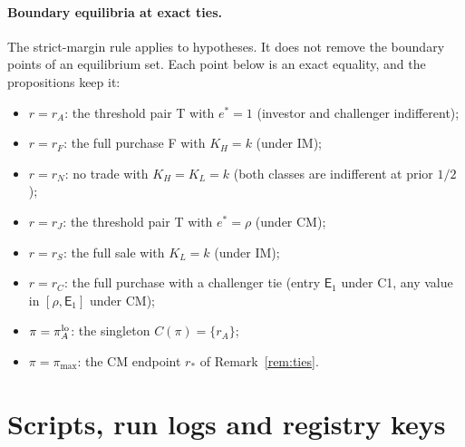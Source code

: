 \documentclass[11pt]{article}
\theoremstyle{definition}
\newcommand{\Ent}{\mathsf E}
\begin{document}
\paragraph{Boundary equilibria at exact ties.} The strict-margin rule applies to hypotheses. It does not remove the
boundary points of an equilibrium set. Each point below is an exact equality, and the propositions keep it:
\begin{itemize}
\item $r=r_A$: the threshold pair T with $e^*=1$ (investor and challenger indifferent);
\item $r=r_F$: the full purchase F with $K_H=k$ (under IM);
\item $r=r_N$: no trade with $K_H=K_L=k$ (both classes are indifferent at prior $1/2$);
\item $r=r_J$: the threshold pair T with $e^*=\rho$ (under CM);
\item $r=r_S$: the full sale with $K_L=k$ (under IM);
\item $r=r_C$: the full purchase with a challenger tie (entry $\Ent_1$ under C1, any value in $[\rho,\Ent_1]$ under CM);
\item $\pi=\pi_A^{\rm lo}$: the singleton $C(\pi)=\{r_A\}$;
\item $\pi=\pi_{\max}$: the CM endpoint $r_*$ of Remark~\ref{rem:ties}.
\end{itemize}

\section{Scripts, run logs and registry keys}\label{sec:scripts}
\end{document}
